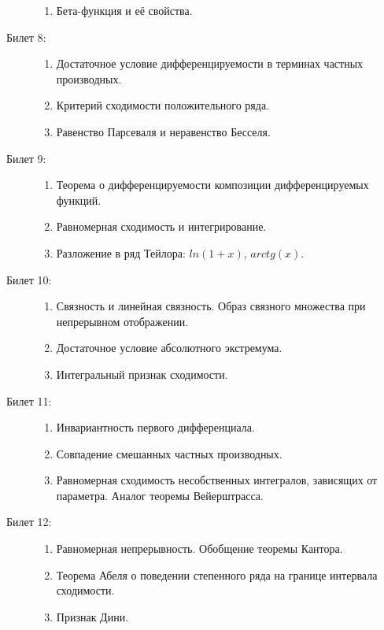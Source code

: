 \documentclass{article}
\begin{document}
\begin{description}
\begin{enumerate}
		\item Бета-функция и её свойства.
	\end{enumerate}
	\item[Билет 8:]\phantom{}
	\begin{enumerate}
		\item Достаточное условие дифференцируемости в терминах
		частных производных.
		\item Критерий сходимости положительного ряда.
		\item Равенство Парсеваля и неравенство Бесселя.
	\end{enumerate}
	\item[Билет 9:]\phantom{}
	\begin{enumerate}
		\item Теорема о дифференцируемости композиции дифференцируемых
		функций.
		\item Равномерная сходимость и интегрирование.
		\item Разложение в ряд Тейлора: $ln(1 + x)$, $arc tg(x)$.
	\end{enumerate}
	\item[Билет 10:]\phantom{}
	\begin{enumerate}
		\item Связность и линейная связность. Образ связного множества
		при непрерывном отображении.
		\item Достаточное условие абсолютного экстремума.
		\item Интегральный признак сходимости.
	\end{enumerate}
	\item[Билет 11:]\phantom{}
	\begin{enumerate}
		\item Инвариантность первого дифференциала.
		\item Совпадение смешанных частных производных.
		\item Равномерная сходимость несобственных интегралов,
		зависящих от параметра. Аналог теоремы Вейерштрасса.
	\end{enumerate}
	\item[Билет 12:]\phantom{}
	\begin{enumerate}
		\item Равномерная непрерывность. Обобщение теоремы Кантора.
		\item Теорема Абеля о поведении степенного ряда на границе
		интервала сходимости.
		\item Признак Дини.
	\end{enumerate}
\end{description}
\end{document}
